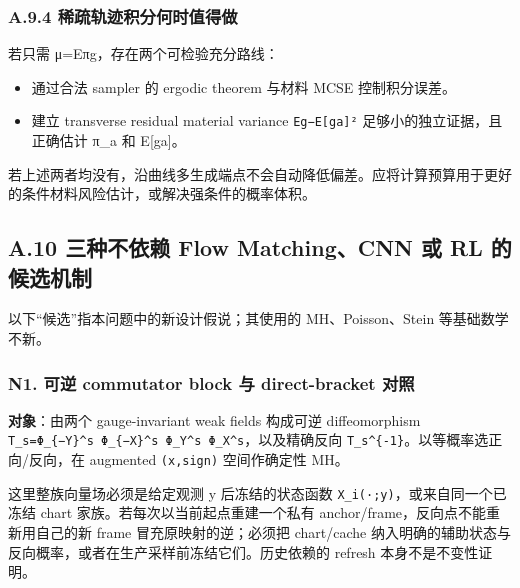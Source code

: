\documentclass[
  11pt,
  a4paper,
]{article}
\providecommand{\tightlist}{%
  \setlength{\itemsep}{0pt}\setlength{\parskip}{0pt}}
\begin{document}
\hypertarget{a.9.4-ux7a00ux758fux8f68ux8ff9ux79efux5206ux4f55ux65f6ux503cux5f97ux505a}{%
\subsubsection{A.9.4
稀疏轨迹积分何时值得做}\label{a.9.4-ux7a00ux758fux8f68ux8ff9ux79efux5206ux4f55ux65f6ux503cux5f97ux505a}}

若只需 μ=Eπg，存在两个可检验充分路线：

\begin{itemize}
\tightlist
\item
  通过合法 sampler 的 ergodic theorem 与材料 MCSE 控制积分误差。
\item
  建立 transverse residual material variance
  \texttt{E\textbar{}\textbar{}g−E{[}g\textbar{}a{]}\textbar{}\textbar{}²}
  足够小的独立证据，且正确估计 π\_\allowbreak{}a 和 E{[}g\textbar a{]}。
\end{itemize}

若上述两者均没有，沿曲线多生成端点不会自动降低偏差。应将计算预算用于更好的条件材料风险估计，或解决强条件的概率体积。

\hypertarget{a.10-ux4e09ux79cdux4e0dux4f9dux8d56-flow-matchingcnn-ux6216-rl-ux7684ux5019ux9009ux673aux5236}{%
\subsection{A.10 三种不依赖 Flow Matching、CNN 或 RL
的候选机制}\label{a.10-ux4e09ux79cdux4e0dux4f9dux8d56-flow-matchingcnn-ux6216-rl-ux7684ux5019ux9009ux673aux5236}}

以下``候选''指本问题中的新设计假说；其使用的 MH、Poisson、Stein
等基础数学不新。

\hypertarget{n1.-ux53efux9006-commutator-block-ux4e0e-direct-bracket-ux5bf9ux7167}{%
\subsubsection{N1. 可逆 commutator block 与 direct-bracket
对照}\label{n1.-ux53efux9006-commutator-block-ux4e0e-direct-bracket-ux5bf9ux7167}}

\textbf{对象}：由两个 gauge-invariant weak fields 构成可逆
diffeomorphism
\texttt{T\_\allowbreak{}s=Φ\_\allowbreak{}\{−Y\}\^{}s\ Φ\_\allowbreak{}\{−X\}\^{}s\ Φ\_\allowbreak{}Y\^{}s\ Φ\_\allowbreak{}X\^{}s}，以及精确反向
\texttt{T\_\allowbreak{}s\^{}\{-1\}}。以等概率选正向/反向，在 augmented
\texttt{(x,sign)} 空间作确定性 MH。

这里整族向量场必须是给定观测 y 后冻结的状态函数
\texttt{X\_\allowbreak{}i(·;y)}，或来自同一个已冻结 chart
家族。若每次以当前起点重建一个私有
anchor/frame，反向点不能重新用自己的新 frame 冒充原映射的逆；必须把
chart/cache
纳入明确的辅助状态与反向概率，或者在生产采样前冻结它们。历史依赖的
refresh 本身不是不变性证明。
\end{document}
